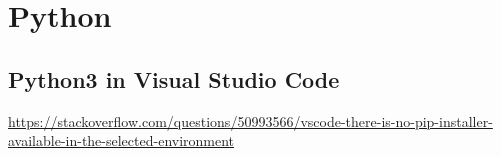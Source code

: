 \section{Python}

\subsection{Python3 in Visual Studio Code}

\url{https://stackoverflow.com/questions/50993566/vscode-there-is-no-pip-installer-available-in-the-selected-environment}